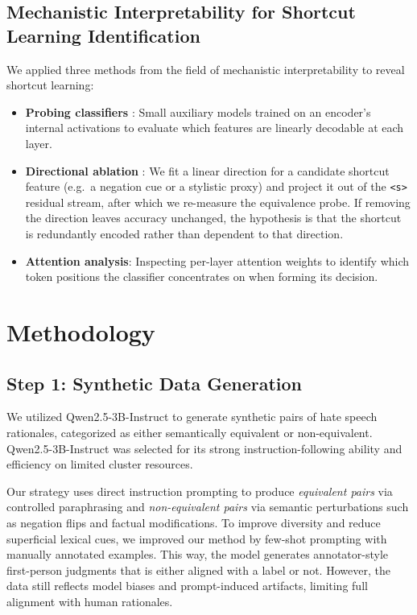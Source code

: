 \documentclass[10pt,conference,compsocconf]{IEEEtran}
\begin{document}
\subsection{Mechanistic Interpretability for Shortcut Learning Identification}
\label{sec:mech_interp_ref}

We applied three methods from the field of mechanistic interpretability to reveal shortcut learning:
\begin{itemize}
    \item \textbf{Probing classifiers} \cite{belinkov2022probing}: Small auxiliary models trained on an encoder’s internal activations to evaluate which features are linearly decodable at each layer.

    \item \textbf{Directional ablation} \cite{ravfogel2020inlp}: We fit a linear
  direction for a candidate shortcut feature (e.g.\ a negation cue or a stylistic proxy) and
  project it out of the \texttt{<s>} residual stream, after which we re-measure the equivalence probe.
  If removing the direction leaves accuracy unchanged, the hypothesis is that the shortcut is redundantly encoded
  rather than dependent to that direction.
      \item \textbf{Attention analysis}: Inspecting per-layer attention weights to identify
  which token positions the classifier concentrates on when forming its decision.
  \end{itemize}


\section{Methodology}

\subsection{Step 1: Synthetic Data Generation}
We utilized Qwen2.5-3B-Instruct to generate synthetic pairs of hate speech rationales, categorized as either semantically equivalent or non-equivalent. Qwen2.5-3B-Instruct was selected for its strong instruction-following ability and efficiency on limited cluster resources. 

Our strategy uses direct instruction prompting to produce \textit{equivalent pairs} via controlled paraphrasing and \textit{non-equivalent pairs} via semantic perturbations such as negation flips and factual modifications. To improve diversity and reduce superficial lexical cues, we improved our method by few-shot prompting with manually annotated examples. This way, the model generates annotator-style first-person judgments that is either aligned with a label or not. However, the data still reflects model biases and prompt-induced artifacts, limiting full alignment with human rationales.
\end{document}

